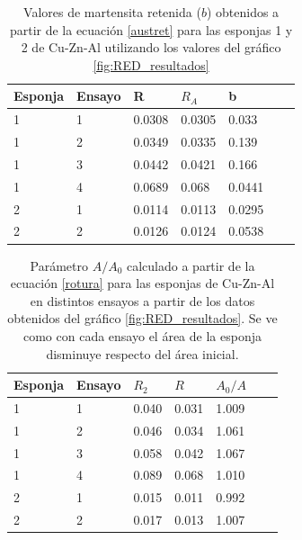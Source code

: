\documentclass[a4paper,12pt,fleqn,twoside,openany]{book}
\begin{document}
 
\begin{table} 
\begin{center} 
\begin{tabular}{@{}lllllll@{}} \toprule
Esponja &Ensayo   &    R    &  ${R_A}$ &  b \\ \midrule
1 & 1       &  0.0308  & 0.0305   & 0.033  \\
1 & 2       &  0.0349  & 0.0335  &  0.139  \\
1 & 3       &  0.0442  & 0.0421  &  0.166  \\
1 & 4      &  0.0689 &	0.068 &	0.0441 \\
2 & 1      &  0.0114 &	0.0113 & 0.0295 \\
2 & 2      &  0.0126 &	0.0124 & 0.0538\\
 \bottomrule

 \end{tabular}
\caption{Valores de martensita retenida ($b$) obtenidos a partir de la ecuación \ref{austret} para las esponjas 1 y 2 de Cu-Zn-Al utilizando los valores del gráfico \ref{fig:RED_resultados} }
\label{tab:b}
\end{center}
\end{table}
\begin{table} 
\begin{center} 
\begin{tabular}{@{}lllllll@{}} \toprule
Esponja & Ensayo   &    $R_2$    &  ${R}$ &  $A_0/A$ \\ \midrule
1   & 1       &  0.040  & 0.031 & 1.009  \\
1   & 2       &  0.046  & 0.034 &  1.061  \\
1   & 3       &  0.058  & 0.042 &  1.067  \\
1   & 4     &  0.089  & 0.068 &  1.010 \\
2   & 1     &  0.015  & 0.011 &  0.992  \\
2   & 2    &  0.017  & 0.013 &  1.007   \\
\bottomrule
\end{tabular}
\caption{Parámetro $A/A_0$ calculado a partir de la ecuación \ref{rotura} para las esponjas de Cu-Zn-Al en distintos ensayos a partir de los datos obtenidos del gráfico \ref{fig:RED_resultados}. Se ve como con cada ensayo el área de la esponja disminuye respecto del área inicial.}
\label{tab:A0Arotura}
\end{center}
\end{table}
 
\end{document}
